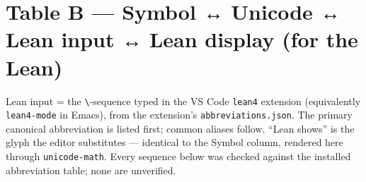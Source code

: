 \documentclass[10pt]{article}
\begin{document}
\section*{Table B — Symbol ↔ Unicode ↔ Lean input ↔ Lean display (for the Lean)}
{\footnotesize
Lean input = the \texttt{\textbackslash}-sequence typed in the VS Code
\texttt{lean4} extension (equivalently \texttt{lean4-mode} in Emacs), from the
extension's \texttt{abbreviations.json}. The primary canonical abbreviation is
listed first; common aliases follow. ``Lean shows'' is the glyph the editor
substitutes — identical to the Symbol column, rendered here through
\texttt{unicode-math}. Every sequence below was checked against the installed
abbreviation table; none are unverified.

}
\end{document}

